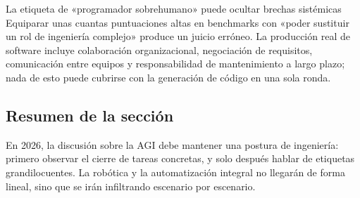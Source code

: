 \begin{warningbox}{La etiqueta de «programador sobrehumano» puede ocultar brechas sistémicas}
Equiparar unas cuantas puntuaciones altas en benchmarks con «poder sustituir un rol de ingeniería complejo» produce un juicio erróneo. La producción real de software incluye colaboración organizacional, negociación de requisitos, comunicación entre equipos y responsabilidad de mantenimiento a largo plazo; nada de esto puede cubrirse con la generación de código en una sola ronda.
\end{warningbox}

\subsection{Resumen de la sección}

En 2026, la discusión sobre la AGI debe mantener una postura de ingeniería: primero observar el cierre de tareas concretas, y solo después hablar de etiquetas grandilocuentes. La robótica y la automatización integral no llegarán de forma lineal, sino que se irán infiltrando escenario por escenario.
